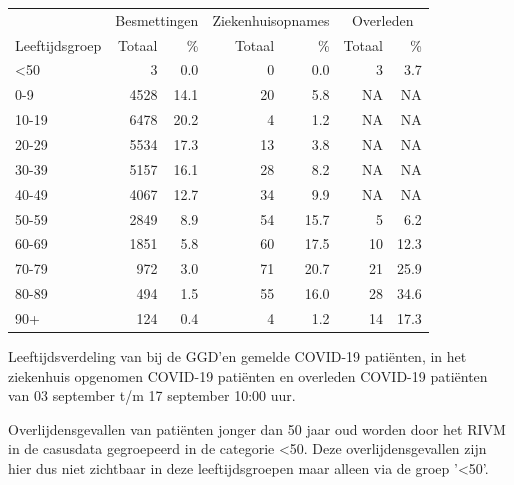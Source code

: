\documentclass[
  english,
  man,floatsintext]{apa6}
\begin{document}
\begin{table}
\centering\begingroup\fontsize{11}{13}\selectfont

\begin{threeparttable}
\begin{tabular}{lrrrrrr}
\toprule
\multicolumn{1}{c}{ } & \multicolumn{2}{c}{Besmettingen} & \multicolumn{2}{c}{Ziekenhuisopnames} & \multicolumn{2}{c}{Overleden} \\
\cmidrule(l{3pt}r{3pt}){2-3} \cmidrule(l{3pt}r{3pt}){4-5} \cmidrule(l{3pt}r{3pt}){6-7}
Leeftijdsgroep & Totaal & \% & Totaal & \% & Totaal & \%\\
\midrule
<50 & 3 & 0.0 & 0 & 0.0 & 3 & 3.7\\
0-9 & 4528 & 14.1 & 20 & 5.8 & NA & NA\\
10-19 & 6478 & 20.2 & 4 & 1.2 & NA & NA\\
20-29 & 5534 & 17.3 & 13 & 3.8 & NA & NA\\
30-39 & 5157 & 16.1 & 28 & 8.2 & NA & NA\\
40-49 & 4067 & 12.7 & 34 & 9.9 & NA & NA\\
50-59 & 2849 & 8.9 & 54 & 15.7 & 5 & 6.2\\
60-69 & 1851 & 5.8 & 60 & 17.5 & 10 & 12.3\\
70-79 & 972 & 3.0 & 71 & 20.7 & 21 & 25.9\\
80-89 & 494 & 1.5 & 55 & 16.0 & 28 & 34.6\\
90+ & 124 & 0.4 & 4 & 1.2 & 14 & 17.3\\
\bottomrule
\end{tabular}
\begin{tablenotes}
\item[1] Leeftijdsverdeling van bij de GGD’en gemelde COVID-19 patiënten, in het ziekenhuis opgenomen COVID-19 patiënten en overleden COVID-19 patiënten van 03 september t/m 17 september 10:00 uur.
\item[2] Overlijdensgevallen van patiënten jonger dan 50 jaar oud worden door het RIVM in de casusdata gegroepeerd in de categorie <50. Deze overlijdensgevallen zijn hier dus niet zichtbaar in deze leeftijdsgroepen maar alleen via de groep '<50'.
\end{tablenotes}
\end{threeparttable}
\endgroup{}
\end{table}

\newpage
\end{document}
